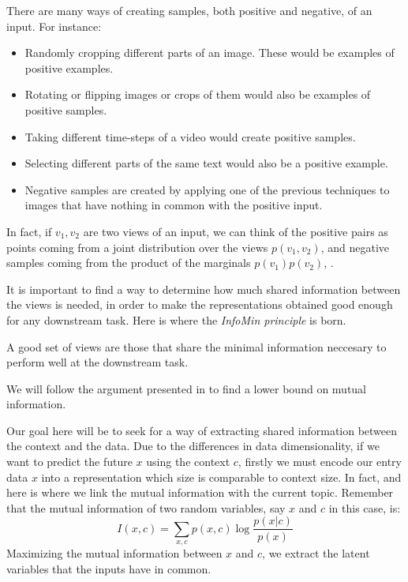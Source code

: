 There are many ways of creating samples, both positive and negative, of an input. For instance:
\begin{itemize}
    \item Randomly cropping different parts of an image. These would be examples of positive examples.
    \item Rotating or flipping images or crops of them would also be examples of positive samples.
    
    \item Taking different time-steps of a video would create positive samples.
    \item Selecting different parts of the same text would also be a positive example.    
    \item Negative samples are created by applying one of the previous techniques to images that have nothing in common with the positive input.
\end{itemize}

In fact, if $v_1,v_2$ are two views of an input, we can think of the positive pairs as points coming from a joint distribution over the views $p(v_1,v_2)$, and negative samples coming from the product of the marginals $p(v_1)p(v_2)$, \citep{tian_what_2020}.

It is important to find a way to determine how much shared information between the views is needed, in order to make the representations obtained good enough for any downstream task. Here is where the \emph{InfoMin principle} is born. 

\begin{ndef}
    A good set of views are those that share the minimal information neccesary to perform well at the downstream task.
\end{ndef} 
We will follow the argument presented in \cite{oord_representation_2019} to find a lower bound on mutual information.


Our goal here will be to seek for a way of extracting shared information between the context and the data. Due to the differences in data dimensionality, if we want to predict the future $x$ using the context $c$, firstly we must
encode our entry data $x$ into a representation which size is comparable to context size.  In fact, and here is where we link the mutual information with the current topic. Remember that the mutual information of two random variables, say $x$ and $c$ in this case, is:
\begin{equation}\label{EQ:MI}
I(x,c) = \sum_{x,c}p(x,c)\log\frac{p(x|c)}{p(x)}
\end{equation}
Maximizing the mutual information between $x$ and $c$, we extract the latent variables that the inputs have in common. 

